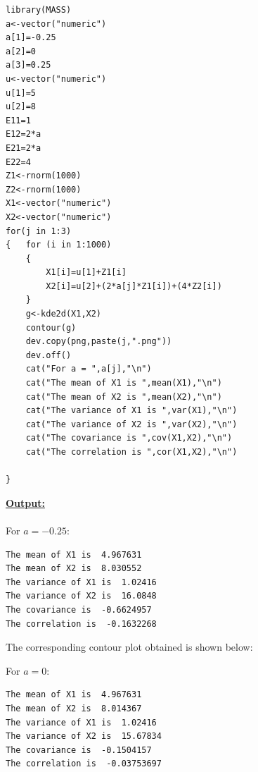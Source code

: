 \documentclass[12pt]{book}
\begin{document}
\begin{lstlisting}
library(MASS)
a<-vector("numeric")
a[1]=-0.25
a[2]=0
a[3]=0.25
u<-vector("numeric")
u[1]=5
u[2]=8
E11=1
E12=2*a
E21=2*a
E22=4
Z1<-rnorm(1000)
Z2<-rnorm(1000)
X1<-vector("numeric")
X2<-vector("numeric")
for(j in 1:3)
{	for (i in 1:1000)
	{
		X1[i]=u[1]+Z1[i]
		X2[i]=u[2]+(2*a[j]*Z1[i])+(4*Z2[i])
	}
	g<-kde2d(X1,X2)
	contour(g)
	dev.copy(png,paste(j,".png"))
	dev.off()
	cat("For a = ",a[j],"\n")
	cat("The mean of X1 is ",mean(X1),"\n")
	cat("The mean of X2 is ",mean(X2),"\n")
	cat("The variance of X1 is ",var(X1),"\n")
	cat("The variance of X2 is ",var(X2),"\n")
	cat("The covariance is ",cov(X1,X2),"\n")
	cat("The correlation is ",cor(X1,X2),"\n")
	
}
\end{lstlisting}
\newpage
\textbf{\underline{Output:}} \\\\
For $a=-0.25$:\\
\begin{lstlisting}
The mean of X1 is  4.967631 
The mean of X2 is  8.030552 
The variance of X1 is  1.02416 
The variance of X2 is  16.0848 
The covariance is  -0.6624957 
The correlation is  -0.1632268 
\end{lstlisting}
The corresponding contour plot obtained is shown below:
\begin{figure}[H]
	\centering
\end{figure}
\newpage
For $a=0$:
\begin{lstlisting}
The mean of X1 is  4.967631 
The mean of X2 is  8.014367 
The variance of X1 is  1.02416 
The variance of X2 is  15.67834 
The covariance is  -0.1504157 
The correlation is  -0.03753697  
\end{lstlisting}
\end{document}
